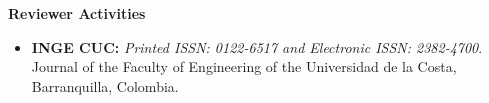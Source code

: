 \documentclass[12pt]{extarticle}
\begin{document}

{\bf\Large Reviewer \textcolor{azul}{Activities}}\\ \vspace*{-6mm}

\begin{itemize}

  \item {\bf INGE CUC:} {\small\em Printed ISSN: 0122-6517 and Electronic ISSN: 2382-4700}. Journal of the Faculty of Engineering of the Universidad de la Costa, Barranquilla, Colombia. 

\end{itemize}

\end{document}

